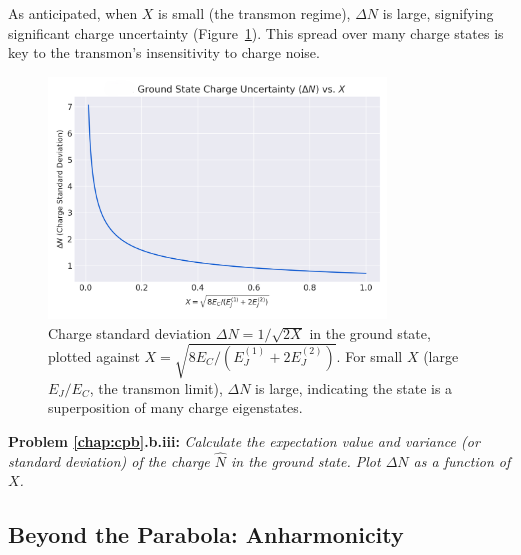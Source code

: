 \documentclass{book}
\newenvironment{problem}[1][Problem]{\par\medskip\noindent\textbf{#1:}\em}{\par\medskip}
\begin{document}
As anticipated, when \(X\) is small (the transmon regime), \(\Delta N\) is large, signifying significant charge uncertainty (Figure~\ref{fig:delta_n}). This spread over many charge states is key to the transmon's insensitivity to charge noise.

\begin{figure}[h]
    \centering
    \includegraphics[width=0.8\textwidth]{fig_delta_n.png}
    \caption[Charge uncertainty vs. E\_C/E\_J ratio]{Charge standard deviation \(\Delta N = 1 / \sqrt{2 X}\) in the ground state, plotted against \(X = \sqrt{8 E_C / (E_J^{(1)} + 2 E_J^{(2)})}\). For small \(X\) (large \(E_J/E_C\), the transmon limit), \(\Delta N\) is large, indicating the state is a superposition of many charge eigenstates.}
    \label{fig:delta_n}
\end{figure}

\begin{problem}[Problem \ref{chap:cpb}.b.iii] 
Calculate the expectation value and variance (or standard deviation) of the charge \(\hat{N}\) in the ground state. Plot \(\Delta N\) as a function of \(X\).
\end{problem}

\subsection[Beyond the Parabola: Anharmonicity]{Beyond the Parabola: Anharmonicity}
\label{subsec:anharmonicity}
\end{document}
